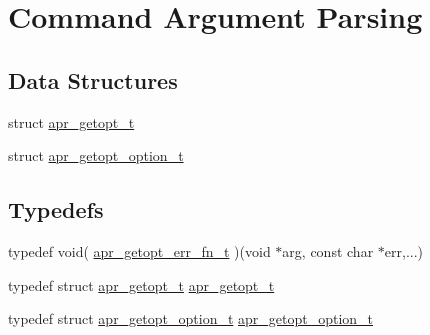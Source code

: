 \hypertarget{group__apr__getopt}{\section{Command Argument Parsing}
\label{group__apr__getopt}
}
\subsection*{Data Structures}
\begin{DoxyCompactItemize}
\item 
struct \hyperlink{structapr__getopt__t}{apr\-\_\-getopt\-\_\-t}
\item 
struct \hyperlink{structapr__getopt__option__t}{apr\-\_\-getopt\-\_\-option\-\_\-t}
\end{DoxyCompactItemize}
\subsection*{Typedefs}
\begin{DoxyCompactItemize}
\item 
typedef void( \hyperlink{group__apr__getopt_gae82318936f08cc3531ce9b0856422f27}{apr\-\_\-getopt\-\_\-err\-\_\-fn\-\_\-t} )(void $\ast$arg, const char $\ast$err,...)
\item 
typedef struct \hyperlink{structapr__getopt__t}{apr\-\_\-getopt\-\_\-t} \hyperlink{group__apr__getopt_gaed49565eab64803e93f76d0c40d6873d}{apr\-\_\-getopt\-\_\-t}
\item 
typedef struct \hyperlink{structapr__getopt__option__t}{apr\-\_\-getopt\-\_\-option\-\_\-t} \hyperlink{group__apr__getopt_ga114d2af52f3573eaeee2ffa73b2c4ff5}{apr\-\_\-getopt\-\_\-option\-\_\-t}
\end{DoxyCompactItemize}
